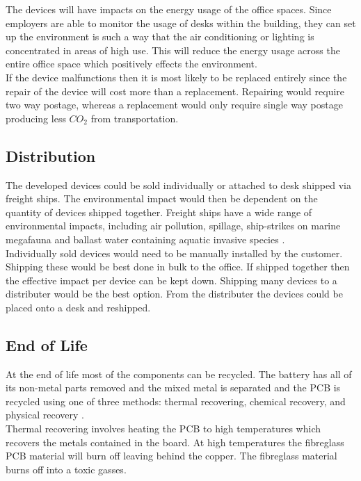 \documentclass[12pt, a4paper]{article}
\begin{document}
The devices will have impacts on the energy usage of the office spaces. Since employers are able to monitor the usage of desks within the building, they can set up the environment is such a way that the air conditioning or lighting is concentrated in areas of high use. This will reduce the energy usage across the entire office space which positively effects the environment. \\

If the device malfunctions then it is most likely to be replaced entirely since the repair of the device will cost more than a replacement. Repairing would require two way postage, whereas a replacement would only require single way postage producing less $CO_2$ from transportation. \\

\subsection{Distribution}
The developed devices could be sold individually or attached to desk shipped via freight ships. The environmental impact would then be dependent on the quantity of devices shipped together. Freight ships have a wide range of environmental impacts, including air pollution, spillage, ship-strikes on marine megafauna and ballast water containing aquatic invasive species \cite{WALKER2019505}. \\

Individually sold devices would need to be manually installed by the customer. Shipping these would be best done in bulk to the office. If shipped together then the effective impact per device can be kept down. Shipping many devices to a distributer would be the best option. From the distributer the devices could be placed onto a desk and reshipped. \\
\subsection{End of Life}
At the end of life most of the components can be recycled. The battery has all of its non-metal parts removed and the mixed metal is separated and the PCB is recycled using one of three methods: thermal recovering, chemical recovery, and physical recovery \cite{pcbRecycling_1}. \\

Thermal recovering involves heating the PCB to high temperatures which recovers the metals contained in the board. At high temperatures the fibreglass PCB material will burn off leaving behind the copper. The fibreglass material burns off into a toxic gasses.\\
\end{document}
